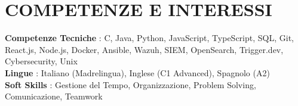 \documentclass[a4paper,10pt]{article}
\begin{document}
\section{COMPETENZE E INTERESSI}
 \begin{itemize}[leftmargin=0in, label={}, itemsep=0.4pt]
    \small{\item{
     \textbf{Competenze Tecniche} {: C, Java, Python, JavaScript, TypeScript, SQL, Git, React.js, Node.js, Docker, Ansible, Wazuh, SIEM, OpenSearch, Trigger.dev, Cybersecurity, Unix}\vspace{1pt} \\
     \textbf{Lingue} {: Italiano (Madrelingua), Inglese (C1 Advanced), Spagnolo (A2)}\vspace{1pt} \\
     \textbf{Soft Skills} {: Gestione del Tempo, Organizzazione, Problem Solving, Comunicazione, Teamwork}
    }}
 \end{itemize}



\end{document}
